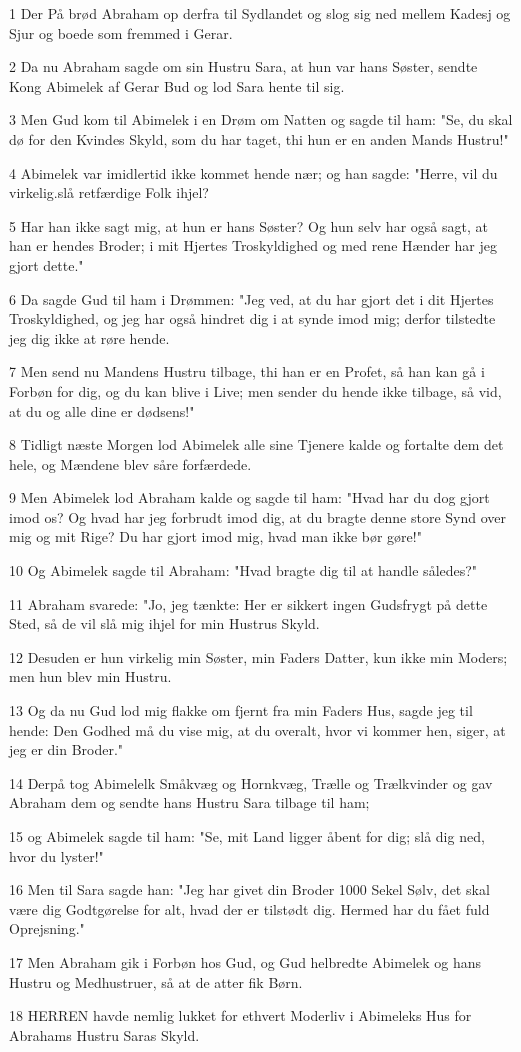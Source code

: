 \par 1 Der På brød Abraham op derfra til Sydlandet og slog sig ned mellem Kadesj og Sjur og boede som fremmed i Gerar.
\par 2 Da nu Abraham sagde om sin Hustru Sara, at hun var hans Søster, sendte Kong Abimelek af Gerar Bud og lod Sara hente til sig.
\par 3 Men Gud kom til Abimelek i en Drøm om Natten og sagde til ham: "Se, du skal dø for den Kvindes Skyld, som du har taget, thi hun er en anden Mands Hustru!"
\par 4 Abimelek var imidlertid ikke kommet hende nær; og han sagde: "Herre, vil du virkelig.slå retfærdige Folk ihjel?
\par 5 Har han ikke sagt mig, at hun er hans Søster? Og hun selv har også sagt, at han er hendes Broder; i mit Hjertes Troskyldighed og med rene Hænder har jeg gjort dette."
\par 6 Da sagde Gud til ham i Drømmen: "Jeg ved, at du har gjort det i dit Hjertes Troskyldighed, og jeg har også hindret dig i at synde imod mig; derfor tilstedte jeg dig ikke at røre hende.
\par 7 Men send nu Mandens Hustru tilbage, thi han er en Profet, så han kan gå i Forbøn for dig, og du kan blive i Live; men sender du hende ikke tilbage, så vid, at du og alle dine er dødsens!"
\par 8 Tidligt næste Morgen lod Abimelek alle sine Tjenere kalde og fortalte dem det hele, og Mændene blev såre forfærdede.
\par 9 Men Abimelek lod Abraham kalde og sagde til ham: "Hvad har du dog gjort imod os? Og hvad har jeg forbrudt imod dig, at du bragte denne store Synd over mig og mit Rige? Du har gjort imod mig, hvad man ikke bør gøre!"
\par 10 Og Abimelek sagde til Abraham: "Hvad bragte dig til at handle således?"
\par 11 Abraham svarede: "Jo, jeg tænkte: Her er sikkert ingen Gudsfrygt på dette Sted, så de vil slå mig ihjel for min Hustrus Skyld.
\par 12 Desuden er hun virkelig min Søster, min Faders Datter, kun ikke min Moders; men hun blev min Hustru.
\par 13 Og da nu Gud lod mig flakke om fjernt fra min Faders Hus, sagde jeg til hende: Den Godhed må du vise mig, at du overalt, hvor vi kommer hen, siger, at jeg er din Broder."
\par 14 Derpå tog Abimelelk Småkvæg og Hornkvæg, Trælle og Trælkvinder og gav Abraham dem og sendte hans Hustru Sara tilbage til ham;
\par 15 og Abimelek sagde til ham: "Se, mit Land ligger åbent for dig; slå dig ned, hvor du lyster!"
\par 16 Men til Sara sagde han: "Jeg har givet din Broder 1000 Sekel Sølv, det skal være dig Godtgørelse for alt, hvad der er tilstødt dig. Hermed har du fået fuld Oprejsning."
\par 17 Men Abraham gik i Forbøn hos Gud, og Gud helbredte Abimelek og hans Hustru og Medhustruer, så at de atter fik Børn.
\par 18 HERREN havde nemlig lukket for ethvert Moderliv i Abimeleks Hus for Abrahams Hustru Saras Skyld.

